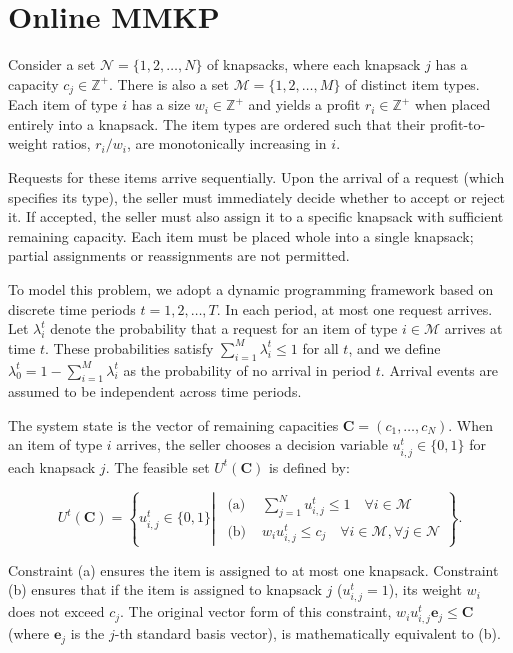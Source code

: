 \section{Online MMKP}\label{sec_dynamic_seat}
Consider a set $\mathcal{N} = \{1, 2, \ldots, N\}$ of knapsacks, where each knapsack $j$ has a capacity $c_j \in \mathbb{Z}^{+}$. There is also a set $\mathcal{M} = \{1, 2, \ldots, M\}$ of distinct item types. Each item of type $i$ has a size $w_i \in \mathbb{Z}^{+}$ and yields a profit $r_i \in \mathbb{Z}^{+}$ when placed entirely into a knapsack. The item types are ordered such that their profit-to-weight ratios, $r_i / w_i$, are monotonically increasing in $i$.

Requests for these items arrive sequentially. Upon the arrival of a request (which specifies its type), the seller must immediately decide whether to accept or reject it. If accepted, the seller must also assign it to a specific knapsack with sufficient remaining capacity. Each item must be placed whole into a single knapsack; partial assignments or reassignments are not permitted.


To model this problem, we adopt a dynamic programming framework based on discrete time periods $t = 1, 2, \ldots, T$. In each period, at most one request arrives. Let $\lambda_i^t$ denote the probability that a request for an item of type $i \in \mathcal{M}$ arrives at time $t$. These probabilities satisfy $\sum_{i=1}^M \lambda_i^t \leq 1$ for all $t$, and we define $\lambda_0^t = 1 - \sum_{i=1}^M \lambda_i^t$ as the probability of no arrival in period $t$. Arrival events are assumed to be independent across time periods.


The system state is the vector of remaining capacities $\mathbf{C} = (c_1, \ldots, c_N)$. When an item of type $i$ arrives, the seller chooses a decision variable $u_{i,j}^t \in \{0,1\}$ for each knapsack $j$. The feasible set $U^t(\mathbf{C})$ is defined by:

$$
U^t(\mathbf{C})=\left\{u_{i, j}^t \in\{0,1\} \left\lvert\, \begin{array}{ll}
\text { (a) } & \sum_{j=1}^N u_{i, j}^t \leq 1 \quad \forall i \in \mathcal{M} \\
\text { (b) } & w_i u_{i, j}^t \leq c_j \quad \forall i \in \mathcal{M}, \forall j \in \mathcal{N}
\end{array}\right.\right\} .
$$

Constraint (a) ensures the item is assigned to at most one knapsack. Constraint (b) ensures that if the item is assigned to knapsack $j$ ($u_{i,j}^t=1$), its weight $w_i$ does not exceed $c_j$. The original vector form of this constraint, $w_{i}u_{i,j}^{t}\mathbf{e}_j \leq \mathbf{C}$ (where $\mathbf{e}_j$ is the $j$-th standard basis vector), is mathematically equivalent to (b).



